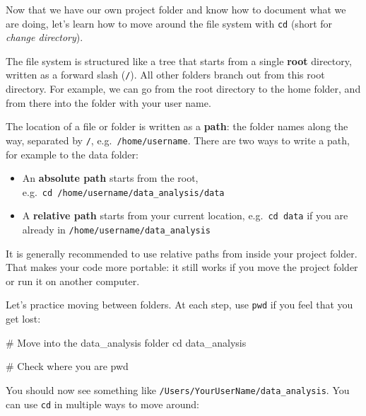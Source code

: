 \documentclass[
  letterpaper,
  DIV=11,
  numbers=noendperiod]{scrreprt}
\newenvironment{Shaded}{}{}
\newcommand{\BuiltInTok}[1]{\textcolor[rgb]{0.84,0.23,0.29}{#1}}
\newcommand{\CommentTok}[1]{\textcolor[rgb]{0.42,0.45,0.49}{#1}}
\newcommand{\NormalTok}[1]{\textcolor[rgb]{0.14,0.16,0.18}{#1}}
\providecommand{\tightlist}{%
  \setlength{\itemsep}{0pt}\setlength{\parskip}{0pt}}
\begin{document}
Now that we have our own project folder and know how to document what we
are doing, let's learn how to move around the file system with
\texttt{cd} (short for \emph{change directory}).

The file system is structured like a tree that starts from a single
\textbf{root} directory, written as a forward slash (\texttt{/}). All
other folders branch out from this root directory. For example, we can
go from the root directory to the home folder, and from there into the
folder with your user name.

The location of a file or folder is written as a \textbf{path}: the
folder names along the way, separated by \texttt{/},
e.g.~\texttt{/home/username}. There are two ways to write a path, for
example to the data folder:

\begin{itemize}
\tightlist
\item
  An \textbf{absolute path} starts from the root,
  e.g.~\texttt{cd\ /home/username/data\_analysis/data}
\item
  A \textbf{relative path} starts from your current location,
  e.g.~\texttt{cd\ data} if you are already in
  \texttt{/home/username/data\_analysis}
\end{itemize}

It is generally recommended to use relative paths from inside your
project folder. That makes your code more portable: it still works if
you move the project folder or run it on another computer.

Let's practice moving between folders. At each step, use \texttt{pwd} if
you feel that you get lost:

\begin{Shaded}
\begin{Highlighting}[]
\CommentTok{\# Move into the data\_analysis folder}
\BuiltInTok{cd}\NormalTok{ data\_analysis}

\CommentTok{\# Check where you are}
\BuiltInTok{pwd}
\end{Highlighting}
\end{Shaded}

You should now see something like
\texttt{/Users/YourUserName/data\_analysis}. You can use \texttt{cd} in
multiple ways to move around:
\end{document}
